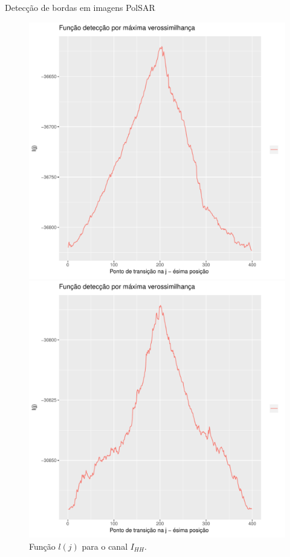 \documentclass[10pt]{beamer}
\begin{document}
\begin{frame}{Detecção de bordas em imagens PolSAR}
  \begin{figure}[hbt]
  \includegraphics[width=\linewidth]{grafico_l_nhfc_2014_sigmahh.pdf}
	\caption{Função $l(j)$ para o canal $I_{HH}$.}
\endminipage\hfill
{}
  \includegraphics[width=\linewidth]{grafico_l_nhfc_2014_sigmahv.pdf}

\end{figure}
\end{frame}
\end{document}
